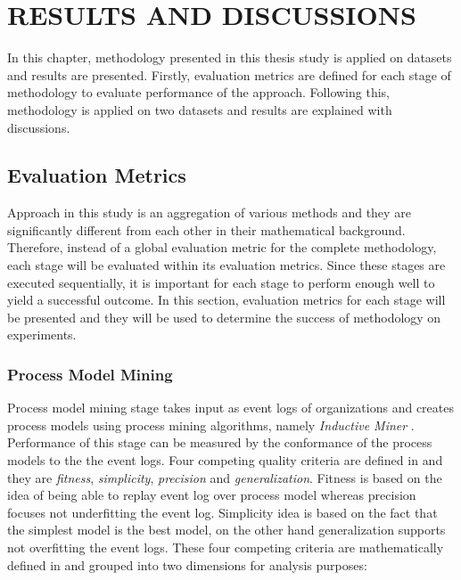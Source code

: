 \chapter{RESULTS AND DISCUSSIONS}
\label{chp:results-and-discussions}

In this chapter, methodology presented in this thesis study is applied on datasets and results are presented. Firstly, evaluation metrics are defined for each stage of methodology to evaluate performance of the approach. Following this, methodology is applied on two datasets and results are explained with discussions.

\section{Evaluation Metrics}
\label{sec:evaluation-metrics}
Approach in this study is an aggregation of various methods and they are significantly different from each other in their mathematical background. Therefore, instead of a global evaluation metric for the complete methodology, each stage will be evaluated within its evaluation metrics. Since these stages are executed sequentially, it is important for each stage to perform enough well to yield a successful outcome. In this section, evaluation metrics for each stage will be presented and they will be used to determine the success of methodology on experiments.

\subsection{Process Model Mining}
\label{subsec:process-model-mining-eval}
Process model mining stage takes input as event logs of organizations and creates process models using process mining algorithms, namely \textit{Inductive Miner} \cite{leemans2014discoveringinfrequent}. Performance of this stage can be measured by the conformance of the process models to the the event logs. Four competing quality criteria are defined in \cite{van2011process} and they are \textit{fitness}, \textit{simplicity}, \textit{precision} and \textit{generalization}. Fitness is based on the idea of being able to replay event log over process model whereas precision focuses not underfitting the event log. Simplicity idea is based on the fact that the simplest model is the best model, on the other hand generalization supports not overfitting the event logs. These four competing criteria are mathematically defined in \cite{rozinat2008conformance} and grouped into two dimensions for analysis purposes:

